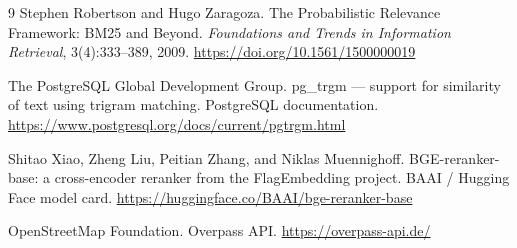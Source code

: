 \documentclass[sigconf,nonacm]{acmart}
\begin{document}
\begin{thebibliography}{9}
Stephen Robertson and Hugo Zaragoza.
\newblock The Probabilistic Relevance Framework: BM25 and Beyond.
\newblock \emph{Foundations and Trends in Information Retrieval}, 3(4):333--389, 2009.
\newblock \url{https://doi.org/10.1561/1500000019}

The PostgreSQL Global Development Group.
\newblock pg\_trgm --- support for similarity of text using trigram matching.
\newblock PostgreSQL documentation.
\newblock \url{https://www.postgresql.org/docs/current/pgtrgm.html}

Shitao Xiao, Zheng Liu, Peitian Zhang, and Niklas Muennighoff.
\newblock BGE-reranker-base: a cross-encoder reranker from the FlagEmbedding project.
\newblock BAAI / Hugging Face model card.
\newblock \url{https://huggingface.co/BAAI/bge-reranker-base}

OpenStreetMap Foundation.
\newblock Overpass API.
\newblock \url{https://overpass-api.de/}

\end{thebibliography}
\end{document}
